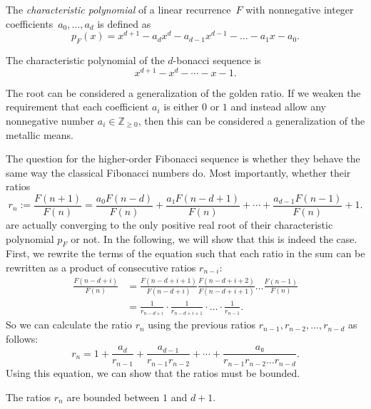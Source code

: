 \begin{definition}
  The \emph{characteristic polynomial} of a linear recurrence~$F$ with
  nonnegative integer coefficients~$a_0, \dots, a_d$ is defined as
  \[
    p_F(x) = x^{d+1} - a_d x^d - a_{d-1} x^{d-1} - \dots - a_1 x - a_0.
  \]
\end{definition}


\begin{example}
  The characteristic polynomial of the $d$-bonacci sequence is
  \[
    x^{d+1} - x^d - ⋯ - x - 1.
  \]
\end{example}

The root can be considered a generalization of the golden ratio.
If we weaken the requirement that each coefficient $a_i$ is either $0$ or $1$ and
instead allow any nonnegative number $a_i ∈ ℤ_{≥ 0}$, then this can be considered a
generalization of the metallic means.

The question for the higher-order Fibonacci sequence is whether they behave the
same way the classical Fibonacci numbers do.
Most importantly, whether their ratios
\[
  r_n
  := \frac{F(n+1)}{F(n)}
  = \frac{a_0 F(n - d)}{F(n)} + \frac{a₁ F(n - d + 1)}{F(n)} + ⋯ + \frac{a_{d-1} F(n-1)}{F(n)} + 1.
\]
are actually converging to the only positive real root of their characteristic
polynomial $p_F$ or not.
In the following, we will show that this is indeed the case.
First, we rewrite the terms of the equation such that each ratio in the sum can
be rewritten as a product of consecutive ratios $r_{n-i}$:
\begin{align*}
  \frac{F(n - d + i)}{F(n)}
  & = \frac{F(n - d + i + 1)}{F(n - d + i)} \frac{F(n - d + i + 2)}{F(n - d + i + 1)} \dots \frac{F(n-1)}{F(n)} \\
  & = \frac{1}{r_{n - d + i}} · \frac{1}{r_{n - d + i + 1}} · \dots · \frac{1}{r_{n-1}}.
\end{align*}
So we can calculate the ratio $r_n$ using the previous ratios $r_{n-1}, r_{n-2}, …, r_{n-d}$ as follows:
\[
  r_n = 1 + \frac{a_d}{r_{n-1}} + \frac{a_{d-1}}{r_{n-1} r_{n-2}} + ⋯ + \frac{a₀}{r_{n-1} r_{n-2} \dots r_{n-d}}.
\]
Using this equation, we can show that the ratios must be bounded.

\begin{lemma}
  The ratios $r_n$ are bounded between $1$ and $d+1$.
\end{lemma}

